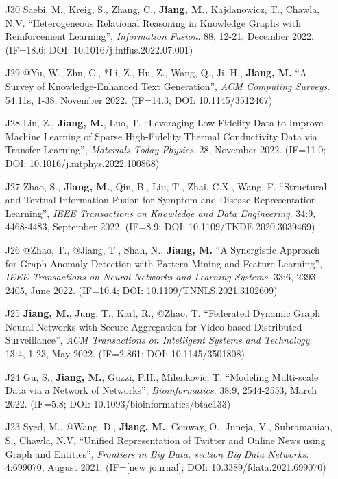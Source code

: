 \documentclass[10pt]{article}
\newenvironment{myindentpar}[1]%
{\begin{list}{}%
         {\setlength{\leftmargin}{#1}}%
         \item[]%
}
{\end{list}}
\newcounter{list}
\begin{document}
\begin{myindentpar}{0.00cm}
\begin{enumerate}[leftmargin=.5cm]
\item[J30] Saebi, M., Kreig, S., Zhang, C., \textbf{Jiang, M.}, Kajdanowicz, T., Chawla, N.V. ``Heterogeneous Relational Reasoning in Knowledge Graphs with Reinforcement Learning'', \textit{Information Fusion}. 88, 12-21, December 2022. (IF=18.6; DOI: 10.1016/j.inffus.2022.07.001)
	
\item[J29] @Yu, W., Zhu, C., *Li, Z., Hu, Z., Wang, Q., Ji, H., \textbf{Jiang, M.} ``A Survey of Knowledge-Enhanced Text Generation'', \textit{ACM Computing Surveys}. 54:11s, 1-38, November 2022. (IF=14.3; DOI: 10.1145/3512467)

\item[J28] Liu, Z., \textbf{Jiang, M.}, Luo, T. ``Leveraging Low-Fidelity Data to Improve Machine Learning of Sparse High-Fidelity Thermal Conductivity Data via Transfer Learning'', \textit{Materials Today Physics}. 28, November 2022. (IF=11.0; DOI: 10.1016/j.mtphys.2022.100868)
	
\item[J27] Zhao, S., \textbf{Jiang, M.}, Qin, B., Liu, T., Zhai, C.X., Wang, F. ``Structural and Textual Information Fusion for Symptom and Disease Representation Learning'', \textit{IEEE Transactions on Knowledge and Data Engineering}. 34:9, 4468-4483, September 2022. (IF=8.9; DOI: 10.1109/TKDE.2020.3039469)

\item[J26] @Zhao, T., @Jiang, T., Shah, N., \textbf{Jiang, M.} ``A Synergistic Approach for Graph Anomaly Detection with Pattern Mining and Feature Learning'', \textit{IEEE Transactions on Neural Networks and Learning Systems}. 33:6, 2393-2405, June 2022. (IF=10.4; DOI: 10.1109/TNNLS.2021.3102609)

\item[J25] \textbf{Jiang, M.}, Jung, T., Karl, R., @Zhao, T. ``Federated Dynamic Graph Neural Networks with Secure Aggregation for Video-based Distributed Surveillance'', \textit{ACM Transactions on Intelligent Systems and Technology}. 13:4, 1-23, May 2022. (IF=2.861; DOI: 10.1145/3501808)

\item[J24] Gu, S., \textbf{Jiang, M.}, Guzzi, P.H., Milenkovic, T. ``Modeling Multi-scale Data via a Network of Networks'', \textit{Bioinformatics}. 38:9, 2544-2553, March 2022. (IF=5.8; DOI: 10.1093/bioinformatics/btac133)

\item[J23] Syed, M., @Wang, D., \textbf{Jiang, M.}, Conway, O., Juneja, V., Subramanian, S., Chawla, N.V. ``Unified Representation of Twitter and Online News using Graph and Entities'', \textit{Frontiers in Big Data, section Big Data Networks}. 4:699070, August 2021. (IF=[new journal]; DOI: 10.3389/fdata.2021.699070)


\end{enumerate}
\end{myindentpar}
\end{document}
